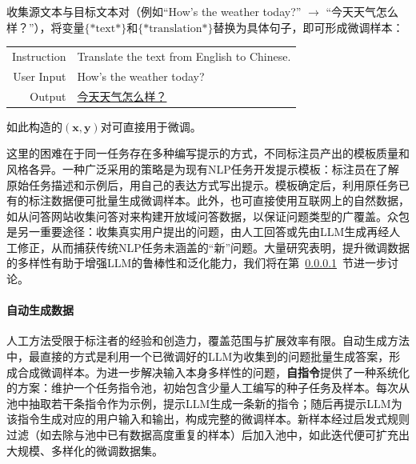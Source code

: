 收集源文本与目标文本对（例如``How's the weather today?'' $\to$ ``今天天气怎么样？''），将变量$\{*\mathrm{text}*\}$和$\{*\mathrm{translation}*\}$替换为具体句子，即可形成微调样本：

\vspace{0.5em}
\begin{tcolorbox}
\begingroup
\renewcommand{\arraystretch}{1.0}
\setlength{\tabcolsep}{6pt}
\begin{tabular}{r l}
{\color{gray} \small{Instruction}} & Translate the text from English to Chinese. \\ [0.2cm]
{\color{gray} \small{User Input}} & How's the weather today?  \\ [0.2cm]
{\color{gray} \small{Output}} & \underline{今天天气怎么样？}
\end{tabular}
\endgroup
\end{tcolorbox}
\vspace{0.5em}

如此构造的$(\mathbf{x},\mathbf{y})$对可直接用于微调。

这里的困难在于同一任务存在多种编写提示的方式，不同标注员产出的模板质量和风格各异。一种广泛采用的策略是为现有NLP任务开发提示模板\cite{bach-etal:2022promptsource,wang-etal:2022super,mishra-etal:2022cross}：标注员在了解原始任务描述和示例后，用自己的表达方式写出提示。模板确定后，利用原任务已有的标注数据便可批量生成微调样本。此外，也可直接使用互联网上的自然数据，如从问答网站收集问答对来构建开放域问答数据\cite{joshi-etal:2017triviaqa}，以保证问题类型的广覆盖。众包是另一重要途径：收集真实用户提出的问题，由人工回答或先由LLM生成再经人工修正，从而捕获传统NLP任务未涵盖的``新''问题。大量研究表明，提升微调数据的多样性有助于增强LLM的鲁棒性和泛化能力，我们将在第~\ref{sec:instruction-generalization}~节进一步讨论。

\paragraph{自动生成数据}
\label{sec:instruction-generalization}

人工方法受限于标注者的经验和创造力，覆盖范围与扩展效率有限。自动生成方法中，最直接的方式是利用一个已微调好的LLM为收集到的问题批量生成答案，形成合成微调样本。为进一步解决输入本身多样性的问题，\textbf{自指令}\cite{wang-etal:2023selfinstruct,honovich-etal:2023unnatural}提供了一种系统化的方案：维护一个任务指令池，初始包含少量人工编写的种子任务及样本。每次从池中抽取若干条指令作为示例，提示LLM生成一条新的指令；随后再提示LLM为该指令生成对应的用户输入和输出，构成完整的微调样本。新样本经过启发式规则过滤（如去除与池中已有数据高度重复的样本）后加入池中，如此迭代便可扩充出大规模、多样化的微调数据集。

